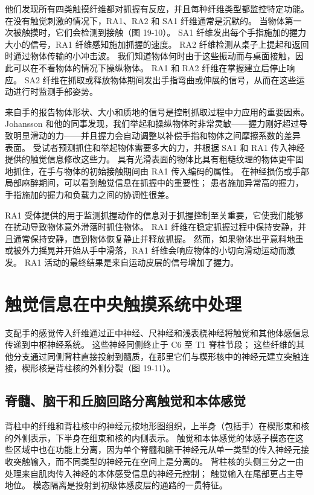 他们发现所有四类触摸纤维都对抓握有反应，并且每种纤维类型都监控特定功能。 在没有触觉刺激的情况下，RA1、RA2 和 SA1 纤维通常是沉默的。 当物体第一次被触摸时，它们会检测到接触（图 19-10）。 SA1 纤维发出每个手指施加的握力大小的信号，RA1 纤维感知施加抓握的速度。 RA2 纤维检测从桌子上提起和返回时通过物体传输的小冲击波。 我们知道物体何时由于这些振动而与桌面接触，因此可以在不看物体的情况下操纵物体。 RA1 和 RA2 纤维在掌握建立后停止响应。 SA2 纤维在抓取或释放物体期间发出手指弯曲或伸展的信号，从而在这些运动进行时监测手部姿势。

来自手的报告物体形状、大小和质地的信号是控制抓取过程中力应用的重要因素。 Johansson 和他的同事发现，我们举起和操纵物体时非常灵敏——握力刚好超过导致明显滑动的力——并且握力会自动调整以补偿手指和物体之间摩擦系数的差异 表面。 受试者预测抓住和举起物体需要多大的力，并根据 SA1 和 RA1 传入神经提供的触觉信息修改这些力。 具有光滑表面的物体比具有粗糙纹理的物体更牢固地抓住，在手与物体的初始接触期间由 RA1 传入编码的属性。 在神经损伤或手部局部麻醉期间，可以看到触觉信息在抓握中的重要性； 患者施加异常高的握力，手指施加的握力和负载力之间的协调性很差。

RA1 受体提供的用于监测抓握动作的信息对于抓握控制至关重要，它使我们能够在扰动导致物体意外滑落时抓住物体。 RA1 纤维在稳定抓握过程中保持安静，并且通常保持安静，直到物体恢复静止并释放抓握。 然而，如果物体出乎意料地重或被外力摇晃并开始从手中滑落，RA1 纤维会响应物体的小切向滑动运动而激发。 RA1 活动的最终结果是来自运动皮层的信号增加了握力。


\section{触觉信息在中央触摸系统中处理}
支配手的感觉传入纤维通过正中神经、尺神经和浅表桡神经将触觉和其他体感信息传递到中枢神经系统。 这些神经同侧终止于 C6 至 T1 脊柱节段； 这些纤维的其他分支通过同侧背柱直接投射到髓质，在那里它们与楔形核中的神经元建立突触连接，楔形核是背柱核的外侧分裂（图 19-11）。

\subsection{脊髓、脑干和丘脑回路分离触觉和本体感觉}
背柱中的纤维和背柱核中的神经元按地形图组织，上半身（包括手）在楔形束和核的外侧表示，下半身在细束和核的内侧表示。 触觉和本体感觉的体感子模态在这些区域中也在功能上分离，因为单个脊髓和脑干神经元从单一类型的传入神经元接收突触输入，而不同类型的神经元在空间上是分离的。 背柱核的头侧三分之一由处理来自肌肉传入神经的本体感受信息的神经元控制； 触觉输入在尾部更占主导地位。 模态隔离是投射到初级体感皮层的通路的一贯特征。

